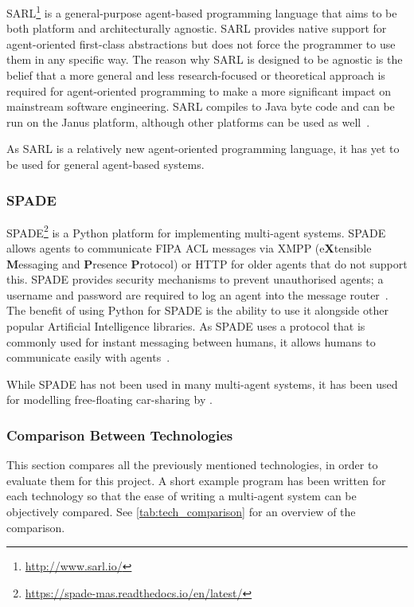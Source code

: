 SARL\footnote{\url{http://www.sarl.io/}} is a general-purpose agent-based programming language that aims to be both platform and architecturally agnostic.
SARL provides native support for agent-oriented first-class abstractions but does not force the programmer to use them in any specific way.
The reason why SARL is designed to be agnostic is the belief that a more general and less research-focused or theoretical approach is required for agent-oriented programming to make a more significant impact on mainstream software engineering.
SARL compiles to Java byte code and can be run on the Janus platform, although other platforms can be used as well~\cite{rodriguez2014sarl}.

As SARL is a relatively new agent-oriented programming language, it has yet to be used for general agent-based systems.

\subsubsection{SPADE}

SPADE\footnote{\url{https://spade-mas.readthedocs.io/en/latest/}} is a Python platform for implementing multi-agent systems.
SPADE allows agents to communicate FIPA ACL messages via XMPP (e\textbf{X}tensible \textbf{M}essaging and \textbf{P}resence \textbf{P}rotocol) or HTTP for older agents that do not support this.
SPADE provides security mechanisms to prevent unauthorised agents; a username and password are required to log an agent into the message router~\cite{gregori2006jabber}.
The benefit of using Python for SPADE is the ability to use it alongside other popular Artificial Intelligence libraries.
As SPADE uses a protocol that is commonly used for instant messaging between humans, it allows humans to communicate easily with agents~\cite{palanca2020spade}.

While SPADE has not been used in many multi-agent systems, it has been used for modelling free-floating car-sharing by .

\subsubsection{Comparison Between Technologies}\label{sec:comparison}

This section compares all the previously mentioned technologies, in order to evaluate them for this project.
A short example program has been written for each technology so that the ease of writing a multi-agent system can be objectively compared.
See \cref{tab:tech_comparison} for an overview of the comparison.

